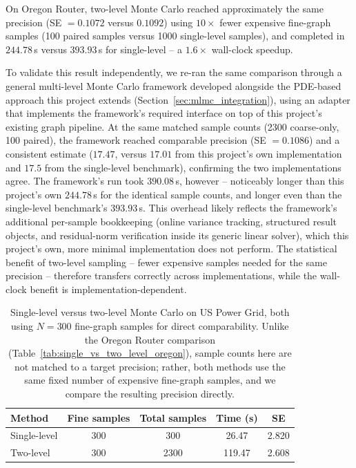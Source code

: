 \documentclass[a4paper,12pt]{amsart}
\numberwithin{equation}{section}
\begin{document}
On Oregon Router, two-level Monte Carlo reached approximately the same 
precision (SE $=0.1072$ versus $0.1092$) using $10\times$ fewer 
expensive fine-graph samples (100 paired samples versus 1000 
single-level samples), and completed in $244.78\,$s versus 
$393.93\,$s for single-level -- a $1.6\times$ wall-clock speedup.

To validate this result independently, we re-ran the same comparison 
through a general multi-level Monte Carlo framework developed 
alongside the PDE-based approach this project extends 
(Section~\ref{sec:mlmc_integration}), using an adapter that implements 
the framework's required interface on top of this project's existing 
graph pipeline. At the same matched sample counts (2300 coarse-only, 
100 paired), the framework reached comparable precision (SE $=0.1086$) 
and a consistent estimate ($17.47$, versus $17.01$ from this project's 
own implementation and $17.5$ from the single-level benchmark), 
confirming the two implementations agree. The framework's run took 
$390.08\,$s, however -- noticeably longer than this project's own 
$244.78\,$s for the identical sample counts, and longer even than the 
single-level benchmark's $393.93\,$s. This overhead likely reflects 
the framework's additional per-sample bookkeeping (online variance 
tracking, structured result objects, and residual-norm verification 
inside its generic linear solver), which this project's own, more 
minimal implementation does not perform. The statistical benefit of 
two-level sampling -- fewer expensive samples needed for the same 
precision -- therefore transfers correctly across implementations, 
while the wall-clock benefit is implementation-dependent.

\begin{table}[htbp]
\centering
\begin{tabular}{lcccc}
\hline
Method & Fine samples & Total samples & Time (s) & SE \\
\hline
Single-level & 300 & 300  & 26.47  & 2.820 \\
Two-level    & 300 & 2300 & 119.47 & 2.608 \\
\hline
\end{tabular}
\caption{Single-level versus two-level Monte Carlo on US Power Grid, 
both using $N=300$ fine-graph samples for direct comparability. Unlike 
the Oregon Router comparison (Table~\ref{tab:single_vs_two_level_oregon}), 
sample counts here are not matched to a target precision; rather, both 
methods use the same fixed number of expensive fine-graph samples, and 
we compare the resulting precision directly.}
\label{tab:single_vs_two_level_powergrid}
\end{table}
\end{document}
